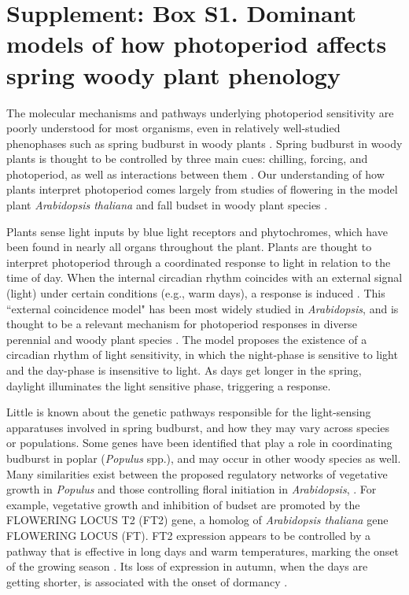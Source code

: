 \documentclass{article}
\begin{document}
\section*{Supplement: Box S1. Dominant models of how photoperiod affects spring woody plant phenology}
\par The molecular mechanisms and pathways underlying photoperiod sensitivity are poorly understood for most organisms, even in relatively well-studied phenophases such as spring budburst in woody plants \citep{ding2016}. Spring budburst in woody plants is thought to be controlled by three main cues: chilling, forcing, and photoperiod, as well as interactions between them \citep{flynn2018,Heide:2008aa, zohner2016}. Our understanding of how plants interpret photoperiod comes largely from studies of flowering in the model plant \emph{Arabidopsis thaliana} \citep[e.g.,][]{suarez2001} and fall budset in woody plant species \citep[e.g., ][]{Howe:1996}. %
\par Plants sense light inputs by blue light receptors and phytochromes, which have been found in nearly all organs throughout the plant. Plants are thought to interpret photoperiod through a coordinated response to light in relation to the time of day. When the internal circadian rhythm coincides with an external signal (light) under certain conditions (e.g., warm days), a response is induced \citep{lagercrantz2009}. This ``external coincidence model" has been most widely studied in \emph{Arabidopsis}, and is thought to be a relevant mechanism for photoperiod responses in diverse perennial and woody plant species \citep{davis2002,petterle2013,bastow2002,kobayashi2007,andres2012,Singh:2017}. %
The model proposes the existence of a circadian rhythm of light sensitivity, in which the night-phase is sensitive to light and the day-phase is insensitive to light. As days get longer in the spring, daylight illuminates the  light sensitive phase, triggering a response. %
\par Little is known about the genetic pathways responsible for the light-sensing apparatuses involved in spring budburst, and how they may vary across species or populations. Some genes have been identified that play a role in coordinating budburst in poplar (\emph{Populus} spp.), and may occur in other woody species as well. Many similarities exist between the proposed regulatory networks of vegetative growth in \emph{Populus} and those controlling floral initiation in \emph{Arabidopsis}, \citet{ding2016}. For example, vegetative growth and inhibition of budset are promoted by the FLOWERING LOCUS T2 (FT2) gene, a homolog of \emph{Arabidopsis thaliana} gene FLOWERING LOCUS (FT). FT2 expression appears to be controlled by a pathway that is effective in long days and warm temperatures, marking the onset of the growing season \citep{hsu2011}. Its loss of expression in autumn, when the days are getting shorter, is associated with the onset of dormancy \citep{glover2014}.
\end{document}
